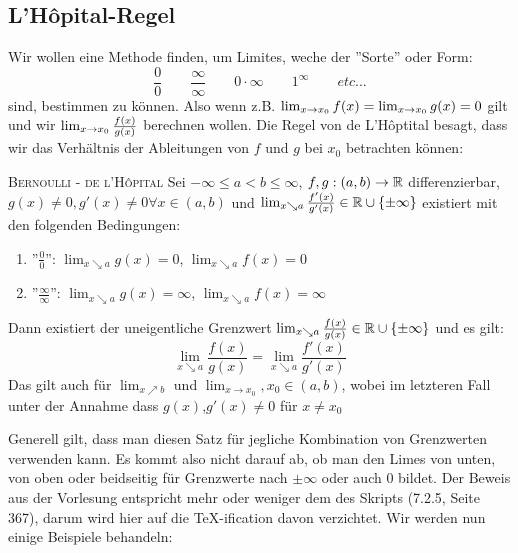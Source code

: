 \subsection{L'Hôpital-Regel}{}
Wir wollen eine Methode finden, um Limites, weche der ''Sorte'' oder Form:
$$\frac{0}{0}\qquad\frac{\infty}{\infty}\qquad0\cdot\infty\qquad 1^\infty \qquad \textit{etc...}$$
sind, bestimmen zu können. Also wenn z.B. $\lim_{x \to x_0}{f(x)}=\lim_{x \to x_0}{g(x)}=0$ gilt und wir $\lim_{x \to x_0}{\frac{f(x)}{g(x)}}$ berechnen wollen. Die Regel von de L'Hôptital besagt, dass wir das Verhältnis der Ableitungen von $f$ und $g$ bei $x_0$ betrachten können:

\begin{satz}{\textsc{Bernoulli - de l'Hôpital}}{}
Sei $-\infty \leq a < b \leq \infty$, $f,g:(a,b) \to \mathbb{R}$ differenzierbar, $g(x)\ne 0, g'(x)\ne 0 \forall x \in (a,b)$ und $\lim_{x \searrow a}\frac{f'(x)}{g'(x)} \in \mathbb{R} \cup \{\pm \infty\}$ existiert mit den folgenden Bedingungen:
\begin{enumerate}
    \item ''$\frac{0}{0}$'': $\lim_{x \searrow a}{g(x)}=0$, $\lim_{x \searrow a}{f(x)}=0$
    \item ''$\frac{\infty}{\infty}$'': $\lim_{x \searrow a}{g(x)}=\infty$, $\lim_{x \searrow a}{f(x)}=\infty$
\end{enumerate}
Dann existiert der uneigentliche Grenzwert $\lim_{x \searrow a}\frac{f(x)}{g(x)} \in \mathbb{R} \cup \{\pm \infty\}$ und es gilt:
$$\lim_{x \searrow a}\frac{f(x)}{g(x)} = \lim_{x \searrow a}\frac{f'(x)}{g'(x)}$$
Das gilt auch für $\lim_{x \nearrow b}$ und $\lim_{x \to x_0}, x_0 \in (a,b)$, wobei im letzteren Fall unter der Annahme dass $g(x)$,$g'(x)\ne 0$ für $x\ne x_0$
\end{satz}
Generell gilt, dass man diesen Satz für jegliche Kombination von Grenzwerten verwenden kann. Es kommt also nicht darauf ab, ob man den Limes von unten, von oben oder beidseitig für Grenzwerte nach $\pm \infty$ oder auch $0$ bildet. Der Beweis aus der Vorlesung entspricht mehr oder weniger dem des Skripts (7.2.5, Seite 367), darum wird hier auf die \TeX-ification davon verzichtet. Wir werden nun einige Beispiele behandeln:


